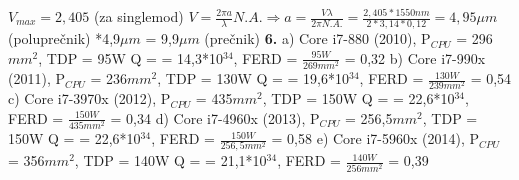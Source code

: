 \documentclass{article}
\begin{document}
$V_{max} = 2,405$ (za singlemod)
\vspace{0.2cm} \newline
\hspace*{0.5cm}$V = \frac{2\pi a}{\lambda}N.A. \Rightarrow a = \frac{V\lambda}{2\pi N.A.} = \frac{2,405*1550nm}{2*3,14*0,12} = 4,95\mu m$ (poluprečnik)
\vspace{0.2cm} \newline
\hspace*{0.5cm}*4,9$\mu m$ = 9,9$\mu m$ (prečnik)
\vspace*{0.4cm}\newline
\textbf{6.} a) Core i7-880 (2010), P$_{CPU}$ = 296$mm^2$, TDP = 95W\vspace{0.2cm} \newline
\hspace*{1cm}\Rightarrow Q =  = 14,3*10$^{34}$, \hspace*{0.4cm} FERD = $\frac{95W}{269mm^2}$ = 0,32
\vspace{0.2cm}\newline 
\hspace*{0.35cm} b) Core i7-990x (2011), P$_{CPU}$ = 236$mm^2$, TDP = 130W\vspace{0.2cm} \newline
\hspace*{1cm}\Rightarrow Q =  = 19,6*10$^{34}$, \hspace*{0.4cm} FERD = $\frac{130W}{239mm^2}$ = 0,54
\vspace{0.2cm}\newline 
\hspace*{0.35cm} c) Core i7-3970x (2012), P$_{CPU}$ = 435$mm^2$, TDP = 150W\vspace{0.2cm} \newline
\hspace*{1cm}\Rightarrow Q =  = 22,6*10$^{34}$, \hspace*{0.4cm} FERD = $\frac{150W}{435mm^2}$ = 0,34
\vspace{0.2cm}\newline 
\hspace*{0.35cm} d) Core i7-4960x (2013), P$_{CPU}$ = 256,5$mm^2$, TDP = 150W\vspace{0.2cm} \newline
\hspace*{1cm}\Rightarrow Q =  = 22,6*10$^{34}$, \hspace*{0.4cm} FERD = $\frac{150W}{256,5mm^2}$ = 0,58
\vspace{0.2cm}\newline 
\hspace*{0.35cm} e) Core i7-5960x (2014), P$_{CPU}$ = 356$mm^2$, TDP = 140W\vspace{0.2cm} \newline
\hspace*{1cm}\Rightarrow Q =  = 21,1*10$^{34}$, \hspace*{0.4cm} FERD = $\frac{140W}{256mm^2}$ = 0,39
\end{document}
